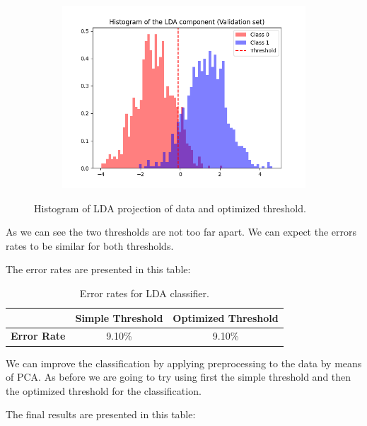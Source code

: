 \documentclass[12pt]{report}
\newcommand{\nl}{%
    \newline
    \noindent
}
\begin{document}
\begin{figure}[H]
    \centering
    \begin{subfigure}[t]{0.7\textwidth}
        \includegraphics[width=\textwidth]{./plot/dim_red/LDA_threshold_opt.png}
    \end{subfigure}
    \caption{Histogram of LDA projection of data and optimized threshold.}
    \label{fig:LDA_threshold_opt}
\end{figure}
\noindent
\nl
As we can see the two thresholds are not too far apart. We can expect the errors rates to be similar for both thresholds.
\nl
The error rates are presented in this table:
\begin{table}[H]
    \centering
    \begin{tabular}{|c|c|c|}
        \rowcolor{blue!10}
        \hline
                            & \textbf{Simple Threshold} & \textbf{Optimized Threshold} \\
        \hline
        \textbf{Error Rate} & 9.10\%                    & 9.10\%                       \\
        \hline
    \end{tabular}
    \caption{Error rates for LDA classifier.}
    \label{tab:LDA_error}
\end{table}
\noindent
We can improve the classification by applying preprocessing to the data by means of PCA. As before we are going to try using first the simple threshold and then the optimized threshold for the classification.
\nl
The final results are presented in this table:
\end{document}
